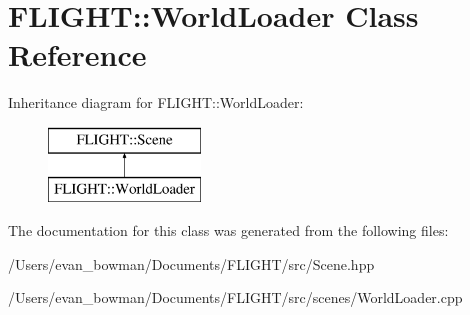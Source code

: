\hypertarget{class_f_l_i_g_h_t_1_1_world_loader}{}\section{F\+L\+I\+G\+HT\+:\+:World\+Loader Class Reference}
\label{class_f_l_i_g_h_t_1_1_world_loader}
Inheritance diagram for F\+L\+I\+G\+HT\+:\+:World\+Loader\+:\begin{figure}[H]
\begin{center}
\leavevmode
\includegraphics[height=2.000000cm]{class_f_l_i_g_h_t_1_1_world_loader}
\end{center}
\end{figure}


The documentation for this class was generated from the following files\+:\begin{DoxyCompactItemize}
\item 
/\+Users/evan\+\_\+bowman/\+Documents/\+F\+L\+I\+G\+H\+T/src/Scene.\+hpp\item 
/\+Users/evan\+\_\+bowman/\+Documents/\+F\+L\+I\+G\+H\+T/src/scenes/World\+Loader.\+cpp\end{DoxyCompactItemize}
